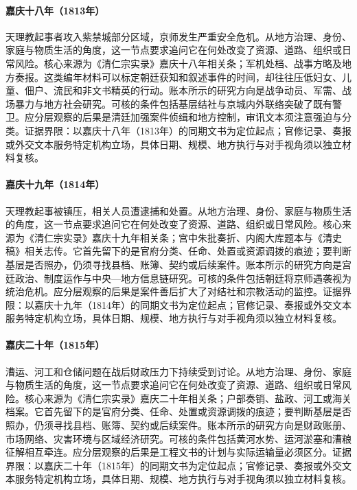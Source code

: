 \hypertarget{social:EQ-1813-TIANLI-UPRISING}{}\paragraph{嘉庆十八年（1813年）}天理教起事者攻入紫禁城部分区域，京师发生严重安全危机。从地方治理、身份、家庭与物质生活的角度，这一节点要求追问它在何处改变了资源、道路、组织或日常风险。核心来源为《清仁宗实录》嘉庆十八年相关条；军机处档、战事方略及地方奏报。这类编年材料可以标定朝廷获知和叙述事件的时间，却往往压低妇女、儿童、佃户、流民和非文书精英的行动。账本所示的研究方向是战争动员、军需、战场暴力与地方社会研究。可核的条件包括基层结社与京城内外联络突破了既有警卫。应分层观察的后果是清廷加强案件侦缉和地方控制，审讯文本须注意强迫与分类。证据界限：以嘉庆十八年（1813年）的同期文书为定位起点；官修记录、奏报或外交文本服务特定机构立场，具体日期、规模、地方执行与对手视角须以独立材料复核。
\hypertarget{social:EQ-1814-TIANLI-SUPPRESSION}{}\paragraph{嘉庆十九年（1814年）}天理教起事被镇压，相关人员遭逮捕和处置。从地方治理、身份、家庭与物质生活的角度，这一节点要求追问它在何处改变了资源、道路、组织或日常风险。核心来源为《清仁宗实录》嘉庆十九年相关条；宫中朱批奏折、内阁大库题本与《清史稿》相关志传。它首先留下的是官府分类、任命、处置或资源调拨的痕迹；要判断基层是否照办，仍须寻找县档、账簿、契约或后续案件。账本所示的研究方向是宫廷政治、制度运作与中央—地方信息链研究。可核的条件包括朝廷将京师遇袭视为统治危机。应分层观察的后果是案件善后扩大了对结社和宗教活动的监控。证据界限：以嘉庆十九年（1814年）的同期文书为定位起点；官修记录、奏报或外交文本服务特定机构立场，具体日期、规模、地方执行与对手视角须以独立材料复核。
\hypertarget{social:EQ-1815-GRAND-CANAL-REPAIRS}{}\paragraph{嘉庆二十年（1815年）}漕运、河工和仓储问题在战后财政压力下持续受到讨论。从地方治理、身份、家庭与物质生活的角度，这一节点要求追问它在何处改变了资源、道路、组织或日常风险。核心来源为《清仁宗实录》嘉庆二十年相关条；户部奏销、盐政、河工或海关档案。它首先留下的是官府分类、任命、处置或资源调拨的痕迹；要判断基层是否照办，仍须寻找县档、账簿、契约或后续案件。账本所示的研究方向是财政账册、市场网络、灾害环境与区域经济研究。可核的条件包括黄河水势、运河淤塞和漕粮征解相互牵连。应分层观察的后果是工程文书的计划与实际运输量必须区分。证据界限：以嘉庆二十年（1815年）的同期文书为定位起点；官修记录、奏报或外交文本服务特定机构立场，具体日期、规模、地方执行与对手视角须以独立材料复核。

